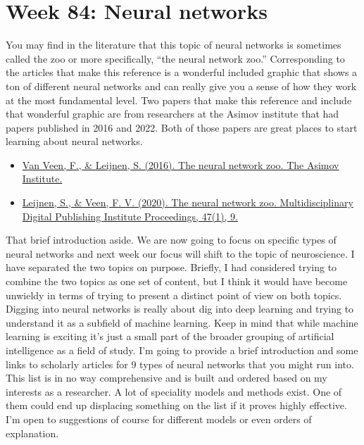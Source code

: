 \documentclass{article}
\begin{document}
\section{Week 84: Neural networks}
You may find in the literature that this topic of neural networks is sometimes called the zoo or more specifically, “the neural network zoo.” Corresponding to the articles that make this reference is a wonderful included graphic that shows a ton of different neural networks and can really give you a sense of how they work at the most fundamental level. Two papers that make this reference and include that wonderful graphic are from researchers at the Asimov institute that had papers published in 2016 and 2022. Both of those papers are great places to start learning about neural networks. 

\begin{itemize}
\item \href{https://www.asimovinstitute.org/neural-network-zoo/}{Van Veen, F., \& Leijnen, S. (2016). The neural network zoo. The Asimov Institute.} \cite{van2016neural}
\item \href{https://www.mdpi.com/2504-3900/47/1/9}{Leijnen, S., \& Veen, F. V. (2020). The neural network zoo. Multidisciplinary Digital Publishing Institute Proceedings, 47(1), 9.} \cite{leijnen2020neural}
\end{itemize}

That brief introduction aside. We are now going to focus on specific types of neural networks and next week our focus will shift to the topic of neuroscience. I have separated the two topics on purpose. Briefly, I had considered trying to combine the two topics as one set of content, but I think it would have become unwieldy in terms of trying to present a distinct point of view on both topics. Digging into neural networks is really about dig into deep learning and trying to understand it as a subfield of machine learning. Keep in mind that while machine learning is exciting it's just a small part of the broader grouping of artificial intelligence as a field of study. I’m going to provide a brief introduction and some links to scholarly articles for 9 types of neural networks that you might run into. This list is in no way comprehensive and is built and ordered based on my interests as a researcher. A lot of speciality models and methods exist. One of them could end up displacing something on the list if it proves highly effective. I’m open to suggestions of course for different models or even orders of explanation.
\end{document}
